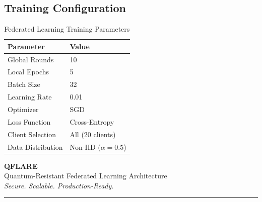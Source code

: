 \documentclass[12pt,a4paper]{article}
\begin{document}
\subsection{Training Configuration}

\begin{table}[H]
\centering
\caption{Federated Learning Training Parameters}
\begin{tabular}{ll}
\toprule
\textbf{Parameter} & \textbf{Value} \\
\midrule
Global Rounds & 10 \\
Local Epochs & 5 \\
Batch Size & 32 \\
Learning Rate & 0.01 \\
Optimizer & SGD \\
Loss Function & Cross-Entropy \\
Client Selection & All (20 clients) \\
Data Distribution & Non-IID ($\alpha=0.5$) \\
\bottomrule
\end{tabular}
\end{table}

\vspace{2cm}

\begin{center}
\Large
\textbf{QFLARE}\\
\normalsize
Quantum-Resistant Federated Learning Architecture\\
\textit{Secure. Scalable. Production-Ready.}\\[1cm]
\textcolor{qflareblue}{\rule{0.5\textwidth}{0.4pt}}
\end{center}
\end{document}
